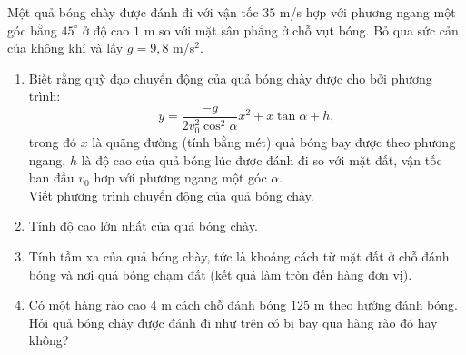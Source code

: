 \begin{bt}%
	Một quả bóng chày được đánh đi với vận tốc $35$ m/s hợp với phương ngang một góc bằng $45^{\circ}$ ở độ cao $1$ m so với mặt sân phẳng ở chỗ vụt bóng. Bỏ qua sức cản của không khí và lấy $g=9{,}8$ m/s$^2$.
	\begin{enumerate}
		\item  Biết rằng quỹ đạo chuyển động của quả bóng chày được cho bởi phương trình:
		$$
		y=\dfrac{-g}{2 v_0^2 \cos ^{2} \alpha} x^2+x \tan \alpha+h,
		$$
		trong đó $x$ là quãng đường (tính bằng mét) quả bóng bay được theo phương ngang, $h$ là độ cao của quả bóng lúc được đánh đi so với mặt đất, vận tốc ban đầu $v_0$ hơp với phương ngang một góc $\alpha$.\\
		Viết phương trình chuyển động của quả bóng chày.
		\item Tính độ cao lớn nhất của quả bóng chày.
		\item   Tính tầm xa của quả bóng chày, tức là khoảng cách từ mặt đất ở chỗ đánh bóng và nơi quả bóng chạm đất (kết quả làm tròn đến hàng đơn vị).
		\item Có một hàng rào cao $4$ m cách chỗ đánh bóng $125$ m theo hướng đánh bóng. Hỏi quả bóng chày được đánh đi như trên có bị bay qua hàng rào đó hay không?
	\end{enumerate}
\end{bt}

